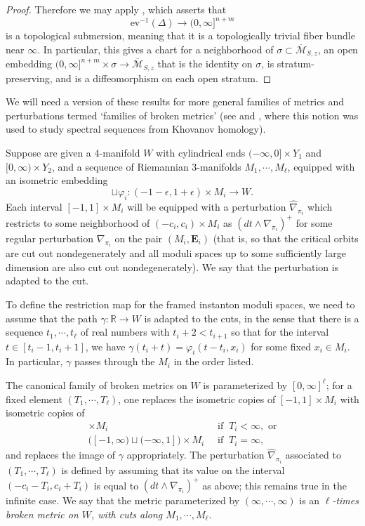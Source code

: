 \documentclass{memo-l}
\theoremstyle{definition}
\theoremstyle{remark}
\numberwithin{section}{chapter}
\numberwithin{equation}{chapter}
\begin{document}
\begin{proof}
Therefore we may apply \cite[Lemma~19.3.3]{KMSW}, which asserts that
$$\text{ev}^{-1}(\Delta) \to (0,\infty]^{n+m}$$
is a topological submersion, meaning that it is a topologically trivial fiber bundle near $\infty$. In particular, this gives a chart for a neighborhood of $\sigma \subset \overline{\mathcal M}_{S,z}$, an open embedding $(0,\infty]^{n+m} \times \sigma \to \overline{\mathcal M}_{S,z}$ that is the identity on $\sigma$, is stratum-preserving, and is a diffeomorphism on each open stratum.
\end{proof}

We will need a version of these results for more general families of metrics and perturbations termed `families of broken metrics' (see \cite{Dae} and \cite{KM3}, where this notion was used to study spectral sequences from Khovanov homology).

Suppose are given a 4-manifold $W$ with cylindrical ends $(-\infty, 0] \times Y_1$ and $[0, \infty) \times Y_2$, and a sequence of Riemannian 3-manifolds $M_1, \cdots, M_\ell$, equipped with an isometric embedding $$\sqcup \varphi_i: (-1-\epsilon, 1+\epsilon) \times M_i \to W.$$ Each interval $[-1, 1] \times M_i$ will be equipped with a perturbation $\widehat{\nabla}_{\pi_i}$ which restricts to some neighborhood of $(-c_i, c_i) \times M_i$ as $(dt \wedge \nabla_{\pi_i})^+$ for some regular perturbation $\nabla_{\pi_i}$ on the pair $(M_i, \mathbf{E}_i)$ (that is, so that the critical orbits are cut out nondegenerately and all moduli spaces up to some sufficiently large dimension are also cut out nondegenerately). We say that the perturbation is adapted to the cut.

To define the restriction map for the framed instanton moduli spaces, we need to assume that the path $\gamma: \mathbb R \to W$ is adapted to the cuts, in the sense that there is a sequence $t_1, \cdots, t_\ell$ of real numbers with $t_i +2 < t_{i+1}$ so that for the interval $t \in [t_i-1, t_i+1]$, we have $\gamma(t_i+t) = \varphi_i(t-t_i, x_i)$ for some fixed $x_i \in M_i$. In particular, $\gamma$ passes through the $M_i$ in the order listed.

The canonical family of broken metrics on $W$ is parameterized by $[0, \infty]^\ell$; for a fixed element $(T_1, \cdots, T_\ell)$, one replaces the isometric copies of $[-1, 1] \times M_i$ with isometric copies of
\begin{align*}[-1-T_i, 1+T_i] \times M_i \;\; &\text{if} \;\; T_i < \infty, \text{ or}\\
\Big([-1,\infty) \sqcup (-\infty, 1]\Big) \times M_i \;\; &\text{if} \;\; T_i = \infty,
\end{align*}
and replaces the image of $\gamma$ appropriately. The perturbation $\widehat{\nabla}_{\pi_i}$ associated to $(T_1, \cdots, T_\ell)$ is defined by assuming that its value on the interval $(-c_i - T_i, c_i+T_i)$ is equal to $(dt \wedge \nabla_{\pi_i})^+$ as above; this remains true in the infinite case. We say that the metric parameterized by $(\infty, \cdots, \infty)$ is an \emph{$\ell$-times broken metric on $W$, with cuts along $M_1, \cdots, M_\ell$}.
\end{document}
